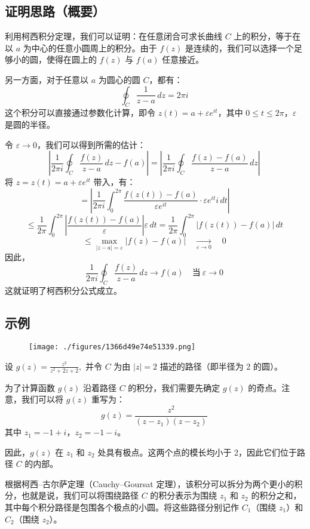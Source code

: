 \subsection{证明思路（概要）}
利用柯西积分定理，我们可以证明：在任意闭合可求长曲线 $C$ 上的积分，等于在以 $a$ 为中心的任意小圆周上的积分。由于 $f(z)$ 是连续的，我们可以选择一个足够小的圆，使得在圆上的 $f(z)$ 与 $f(a)$ 任意接近。

另一方面，对于任意以 $a$ 为圆心的圆 $C$，都有：
$$
\oint_{C} \frac{1}{z - a} \, dz = 2\pi i~
$$
这个积分可以直接通过参数化计算，即令 $z(t) = a + \varepsilon e^{it}$，其中 $0 \leq t \leq 2\pi$，$\varepsilon$ 是圆的半径。

令 $\varepsilon \to 0$，我们可以得到所需的估计：
$$
\left| \frac{1}{2\pi i} \oint_{C} \frac{f(z)}{z - a} \, dz - f(a) \right|
= \left| \frac{1}{2\pi i} \oint_{C} \frac{f(z) - f(a)}{z - a} \, dz \right|~
$$
将 $z = z(t) = a + \varepsilon e^{it}$ 带入，有：
$$
= \left| \frac{1}{2\pi i} \int_0^{2\pi} \frac{f(z(t)) - f(a)}{\varepsilon e^{it}} \cdot \varepsilon e^{it} i \, dt \right|~
$$
$$
\leq \frac{1}{2\pi} \int_0^{2\pi} \left| \frac{f(z(t)) - f(a)}{\varepsilon} \right| \varepsilon \, dt
= \frac{1}{2\pi} \int_0^{2\pi} |f(z(t)) - f(a)| \, dt~
$$
$$
\leq \max_{|z - a| = \varepsilon} |f(z) - f(a)| \quad \xrightarrow[\varepsilon \to 0]{} \quad 0~
$$
因此，
$$
\frac{1}{2\pi i} \oint_{C} \frac{f(z)}{z - a} \, dz \to f(a) \quad \text{当}~ \varepsilon \to 0~
$$
这就证明了柯西积分公式成立。
\subsection{示例}
\begin{figure}[ht]
\centering
\texttt{[image: ./figures/1366d49e74e51339.png]}
\caption{} \label{fig_KXjfgs_1}
\end{figure}
设
$g(z) = \frac{z^2}{z^2 + 2z + 2},$
并令 $C$ 为由 $|z| = 2$ 描述的路径（即半径为 2 的圆）。

为了计算函数 $g(z)$ 沿着路径 $C$ 的积分，我们需要先确定 $g(z)$ 的奇点。注意，我们可以将 $g(z)$ 重写为：
$$
g(z) = \frac{z^2}{(z - z_1)(z - z_2)}~
$$
其中 $z_1 = -1 + i$，$z_2 = -1 - i$。

因此，$g(z)$ 在 $z_1$ 和 $z_2$ 处具有极点。这两个点的模长均小于 2，因此它们位于路径 $C$ 的内部。

根据柯西–古尔萨定理（Cauchy–Goursat 定理），该积分可以拆分为两个更小的积分，也就是说，我们可以将围绕路径 $C$ 的积分表示为围绕 $z_1$ 和 $z_2$ 的积分之和，其中每个积分路径是包围各个极点的小圆。将这些路径分别记作 $C_1$（围绕 $z_1$）和 $C_2$（围绕 $z_2$）。

